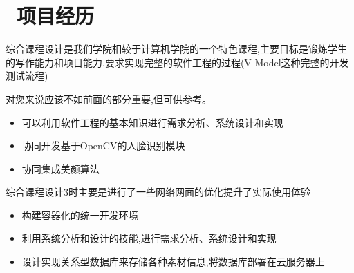 \documentclass{resume}
\begin{document}
\section{\faUsers\ 项目经历}
综合课程设计是我们学院相较于计算机学院的一个特色课程,主要目标是锻炼学生的写作能力和项目能力,要求实现完整的软件工程的过程(V-Model这种完整的开发测试流程)

对您来说应该不如前面的部分重要,但可供参考。
\begin{onehalfspacing}
\begin{itemize}
  \item 可以利用软件工程的基本知识进行需求分析、系统设计和实现
  \item 协同开发基于OpenCV的人脸识别模块
  \item 协同集成美颜算法
\end{itemize}
\end{onehalfspacing}

\begin{onehalfspacing}
综合课程设计3时主要是进行了一些网络网面的优化提升了实际使用体验
\begin{itemize}
  \item 构建容器化的统一开发环境
  \item 利用系统分析和设计的技能,进行需求分析、系统设计和实现
  \item 设计实现关系型数据库来存储各种素材信息,将数据库部署在云服务器上
\end{itemize}
\end{onehalfspacing}
\end{document}
